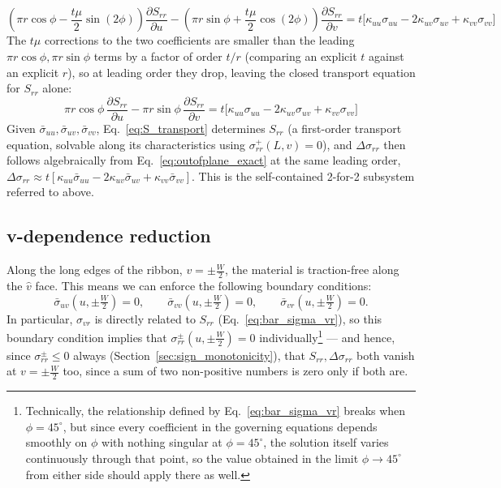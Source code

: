 \documentclass[11pt]{article}
\begin{document}
\begin{equation}
    \left(\pi r\cos\phi - \frac{t\mu}{2}\sin(2\phi)\right)\frac{\partial S_{rr}}{\partial u} - \left(\pi r\sin\phi+\frac{t\mu}{2}\cos(2\phi)\right)\frac{\partial S_{rr}}{\partial v} = t\big[\kappa_{uu}\sigma_{uu}-2\kappa_{uv}\sigma_{uv}+\kappa_{vv}\sigma_{vv}\big]
\end{equation}
The $t\mu$ corrections to the two coefficients are smaller than the leading $\pi r\cos\phi,\pi r\sin\phi$ terms by a factor of order $t/r$ (comparing an explicit $t$ against an explicit $r$), so at leading order they drop, leaving the closed transport equation for $S_{rr}$ alone: 
\begin{equation}\label{eq:S_transport}
    \boxed{\pi r\cos\phi\,\frac{\partial S_{rr}}{\partial u} - \pi r\sin\phi\,\frac{\partial S_{rr}}{\partial v} = t\big[\kappa_{uu}\sigma_{uu}-2\kappa_{uv}\sigma_{uv}+\kappa_{vv}\sigma_{vv}\big]}
\end{equation}
Given $\bar\sigma_{uu},\bar\sigma_{uv},\bar\sigma_{vv}$, Eq.~\eqref{eq:S_transport} determines $S_{rr}$ (a first-order transport equation, solvable along its characteristics using $\sigma_{rr}^+(L,v)=0$), and $\Delta\sigma_{rr}$ then follows algebraically from Eq.~\eqref{eq:outofplane_exact} at the same leading order, $\Delta\sigma_{rr}\approx t[\kappa_{uu}\bar\sigma_{uu}-2\kappa_{uv}\bar\sigma_{uv}+\kappa_{vv}\bar\sigma_{vv}]$. This is the self-contained 2-for-2 subsystem referred to above.

\subsection{v-dependence reduction}\label{sec:v_dependence_reduction}
Along the long edges of the ribbon, $v=\pm\frac W2$, the material is traction-free along the $\hat v$ face. This means we can enforce the following boundary conditions:
\begin{equation}
    \bar\sigma_{uv}\!\left(u,\pm\tfrac W2\right) = 0, \qquad \bar\sigma_{vv}\!\left(u,\pm\tfrac W2\right) = 0, \qquad \bar\sigma_{vr}\!\left(u,\pm\tfrac W2\right) = 0.
\end{equation}
In particular, $\sigma_{vr}$ is directly related to $S_{rr}$ (Eq.~\eqref{eq:bar_sigma_vr}), so this boundary condition implies that $\sigma_{rr}^\pm\!\left(u,\pm\tfrac W2\right) = 0$ individually\footnote{Technically, the relationship defined by Eq.~\eqref{eq:bar_sigma_vr} breaks when $\phi=45^\circ$, but since every coefficient in the governing equations depends smoothly on $\phi$ with nothing singular at $\phi=45^\circ$, the solution itself varies continuously through that point, so the value obtained in the limit $\phi\to45^\circ$ from either side should apply there as well.} --- and hence, since $\sigma_{rr}^\pm\le0$ always (Section~\ref{sec:sign_monotonicity}), that $S_{rr},\Delta\sigma_{rr}$ both vanish at $v=\pm\frac W2$ too, since a sum of two non-positive numbers is zero only if both are.
\end{document}
